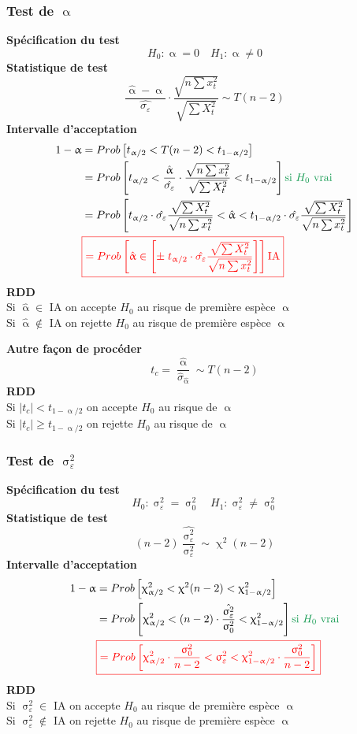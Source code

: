 \documentclass{article}
\newcommand{\halpha}{\hat{\upalpha}}
\newcommand{\sig}{\upsigma_\varepsilon^2}
\newcommand{\studn}{t_{\upalpha / 2}}
\newcommand{\studp}{t_{1 - \upalpha / 2}}
\newcommand{\chin}{\upchi_{\upalpha / 2}^2}
\newcommand{\chip}{\upchi_{1 - \upalpha / 2}^2}
\begin{document}
\subsubsection{Test de $\upalpha$}
\textbf{Spécification du test} \\
\[H_0 : \upalpha = 0 \quad H_1 : \upalpha \neq 0\]
\textbf{Statistique de test}
\[ \frac{\halpha - \upalpha}{\hat{\sigma_\varepsilon}} \cdot \frac{\sqrt{n \sum x_t^2}}{\sqrt{\sum X_t^2}} \sim T(n-2) \]
\textbf{Intervalle d'acceptation}
\begin{align*}
    1- \upalpha &= Prob\left[\studn < T(n-2) <\studp\right] \\
    &= Prob\left[\studn<  \frac{\halpha}{\hat{\sigma_\varepsilon}} \cdot \frac{\sqrt{n \sum x_t^2}}{\sqrt{\sum X_t^2}}<\studp\right] {\color{ForestGreen}\textrm{si }H_0 \textrm{ vrai}}\\
    &= Prob\left[\studn \cdot \hat{\sigma_\varepsilon} \frac{\sqrt{\sum X_t^2}}{\sqrt{n \sum x_t^2}}   < \halpha <\studp \cdot \hat{\sigma_\varepsilon} \frac{\sqrt{\sum X_t^2}}{\sqrt{n \sum x_t^2}} \right]\\
    &{\color{red} \boxed{= Prob\left[\halpha \in \left[\pm \; \studn \cdot \hat{\sigma_\varepsilon} \frac{\sqrt{\sum X_t^2}}{\sqrt{n \sum x_t^2}}  \right]\right] \textrm{IA} }}
\end{align*}
\textbf{RDD } \\
Si $\halpha \in $ IA on accepte $H_0$ au risque de première espèce $\upalpha$ \\
Si $\halpha \notin $ IA on rejette $H_0$ au risque de première espèce $\upalpha$ 

\textbf{Autre façon de procéder} 
\[t_c = \frac{\halpha}{\hat{\sigma}_{\hat{\upalpha}}} \sim T(n-2)\]
\textbf{RDD}\\
Si $|t_c| < \studp $ on accepte $H_0$ au risque de $\upalpha$ \\
Si $|t_c| \geq \studp $ on rejette $H_0$ au risque de $\upalpha$ \\
\subsubsection{Test de $\sig$}
\textbf{Spécification du test} 
\[H_0 : \sig = \upsigma_0^2 \quad H_1 : \sig \neq \upsigma_0^2\]
\textbf{Statistique de test} 
\[(n-2) \frac{\hat{\sig}}{\sig} \sim \upchi^2 (n-2)\]
\textbf{Intervalle d'acceptation}
\begin{align*}
	1 - \upalpha &= Prob\left[\chin<\upchi^2 (n-2)<\chip\right] \\
	&= Prob\left[\chin < (n-2) \cdot \frac{\hat{\sig}}{\upsigma_0^2} < \chip \right] {\color{ForestGreen}\textrm{si }H_0 \textrm{ vrai}}\\
	&{\color{red}\boxed{ = Prob\left[\chin \cdot \frac{\upsigma_ 0^2}{n-2} < \sig < \chip \cdot \frac{\upsigma_ 0^2}{n-2} \right]}}
\end{align*}
\textbf{RDD} \\
	Si $\sig \in $ IA on accepte $H_0$ au risque de première espèce $\upalpha$ \\
	Si $\sig \notin $ IA on rejette $H_0$ au risque de première espèce $\upalpha$
\end{document}
